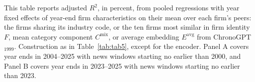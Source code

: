 \begin{table}[htbp]
\centering
\caption{Firm Networks with ChronoGPT$_{1999}$}
\label{tab:tabB_networks}
\begin{minipage}{\linewidth}\footnotesize
This table reports adjusted $R^2$, in percent, from pooled regressions with year fixed effects of year-end firm characteristics on their mean over each firm's peers: the firms sharing its industry code, or the ten firms most similar in firm identity $F$, mean category component $C^{\mathrm{mix}}$, or average embedding $E^{\mathrm{avg}}$ from ChronoGPT$_{1999}$. Construction as in Table~\ref{tab:tab5}, except for the encoder. Panel A covers year ends in 2004--2025 with news windows starting no earlier than 2000, and Panel B covers year ends in 2023--2025 with news windows starting no earlier than 2023.
\end{minipage}
\medskip


\end{table}
